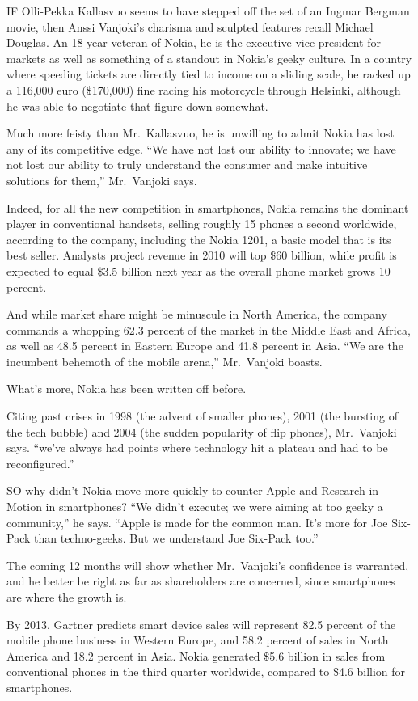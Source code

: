 ﻿\documentclass[12pt]{article}
\begin{document}
IF Olli-Pekka Kallasvuo seems to have stepped off the set of an Ingmar Bergman movie, then Anssi
Vanjoki's charisma and sculpted features recall Michael Douglas. An 18-year veteran of Nokia, he is
the executive vice president for markets as well as something of a standout in Nokia's geeky
culture. In a country where speeding tickets are directly tied to income on a sliding scale, he
racked up a 116,000 euro (\$170,000) fine racing his motorcycle through Helsinki, although he was
able to negotiate that figure down somewhat.

Much more feisty than Mr.~Kallasvuo, he is unwilling to admit Nokia has lost any of its competitive
edge. ``We have not lost our ability to innovate; we have not lost our ability to truly understand
the consumer and make intuitive solutions for them,'' Mr.~Vanjoki says.

Indeed, for all the new competition in smartphones, Nokia remains the dominant player in
conventional handsets, selling roughly 15 phones a second worldwide, according to the company,
including the Nokia 1201, a basic model that is its best seller. Analysts project revenue in 2010
will top \$60 billion, while profit is expected to equal \$3.5 billion next year as the overall
phone market grows 10 percent.

And while market share might be minuscule in North America, the company commands a whopping 62.3
percent of the market in the Middle East and Africa, as well as 48.5 percent in Eastern Europe and
41.8 percent in Asia. ``We are the incumbent behemoth of the mobile arena,'' Mr.~Vanjoki boasts.

What's more, Nokia has been written off before.

Citing past crises in 1998 (the advent of smaller phones), 2001 (the bursting of the tech bubble)
and 2004 (the sudden popularity of flip phones), Mr.~Vanjoki says. ``we've always had points where
technology hit a plateau and had to be reconfigured.''

SO why didn't Nokia move more quickly to counter Apple and Research in Motion in smartphones? ``We
didn't execute; we were aiming at too geeky a community,'' he says. ``Apple is made for the common
man. It's more for Joe Six-Pack than techno-geeks. But we understand Joe Six-Pack too.''

The coming 12 months will show whether Mr.~Vanjoki's confidence is warranted, and he better be right
as far as shareholders are concerned, since smartphones are where the growth is.

By 2013, Gartner predicts smart device sales will represent 82.5 percent of the mobile phone
business in Western Europe, and 58.2 percent of sales in North America and 18.2 percent in Asia.
Nokia generated \$5.6 billion in sales from conventional phones in the third quarter worldwide,
compared to \$4.6 billion for smartphones.
\end{document}
